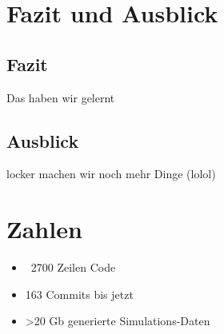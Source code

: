\section{Fazit und Ausblick}
\subsection{Fazit}
Das haben wir gelernt
\subsection{Ausblick}
locker machen wir noch mehr Dinge (lolol)

\section{Zahlen}
\begin{itemize}
    \item ~2700 Zeilen Code
    \item 163 Commits bis jetzt
    \item >20 Gb generierte Simulations-Daten
\end{itemize}

